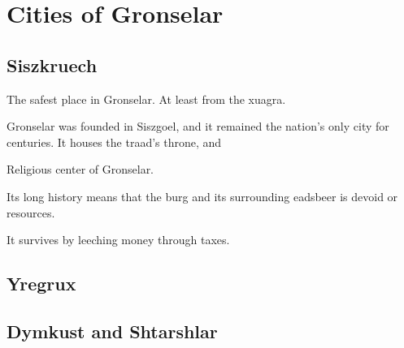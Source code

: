 \section{Cities of Gronselar}
\subsection*{Siszkruech}
The safest place in Gronselar. At least from the xuagra.

Gronselar was founded in Siszgoel, and it remained the nation's only city for centuries.
It houses the traad's throne, and 

Religious center of Gronselar.

Its long history means that the burg and its surrounding eadsbeer is devoid or resources.

It survives by leeching money through taxes.

\subsection*{Yregrux}

\subsection*{Dymkust and Shtarshlar}
